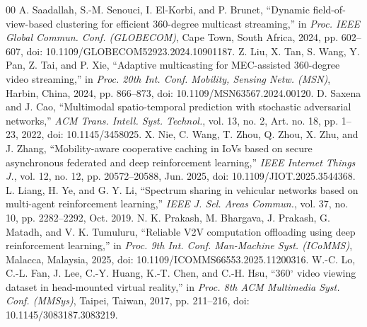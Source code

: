 \documentclass[conference]{IEEEtran}
\begin{document}
\begin{thebibliography}{00}
 A. Saadallah, S.-M. Senouci, I. El-Korbi, and P. Brunet, ``Dynamic field-of-view-based clustering for efficient 360-degree multicast streaming,'' in \textit{Proc. IEEE Global Commun. Conf. (GLOBECOM)}, Cape Town, South Africa, 2024, pp. 602--607, doi: 10.1109/GLOBECOM52923.2024.10901187.
 Z. Liu, X. Tan, S. Wang, Y. Pan, Z. Tai, and P. Xie, ``Adaptive multicasting for MEC-assisted 360-degree video streaming,'' in \textit{Proc. 20th Int. Conf. Mobility, Sensing Netw. (MSN)}, Harbin, China, 2024, pp. 866--873, doi: 10.1109/MSN63567.2024.00120.
 D. Saxena and J. Cao, ``Multimodal spatio-temporal prediction with stochastic adversarial networks,'' \textit{ACM Trans. Intell. Syst. Technol.}, vol. 13, no. 2, Art. no. 18, pp. 1--23, 2022, doi: 10.1145/3458025.
 X. Nie, C. Wang, T. Zhou, Q. Zhou, X. Zhu, and J. Zhang, ``Mobility-aware cooperative caching in IoVs based on secure asynchronous federated and deep reinforcement learning,'' \textit{IEEE Internet Things J.}, vol. 12, no. 12, pp. 20572--20588, Jun. 2025, doi: 10.1109/JIOT.2025.3544368.
 L. Liang, H. Ye, and G. Y. Li, ``Spectrum sharing in vehicular networks based on multi-agent reinforcement learning,'' \textit{IEEE J. Sel. Areas Commun.}, vol. 37, no. 10, pp. 2282--2292, Oct. 2019.
 N. K. Prakash, M. Bhargava, J. Prakash, G. Matadh, and V. K. Tumuluru, ``Reliable V2V computation offloading using deep reinforcement learning,'' in \textit{Proc. 9th Int. Conf. Man-Machine Syst. (ICoMMS)}, Malacca, Malaysia, 2025, doi: 10.1109/ICOMMS66553.2025.11200316.
 W.-C. Lo, C.-L. Fan, J. Lee, C.-Y. Huang, K.-T. Chen, and C.-H. Hsu, ``360$^\circ$ video viewing dataset in head-mounted virtual reality,'' in \textit{Proc. 8th ACM Multimedia Syst. Conf. (MMSys)}, Taipei, Taiwan, 2017, pp. 211--216, doi: 10.1145/3083187.3083219.
\end{thebibliography}
\end{document}
